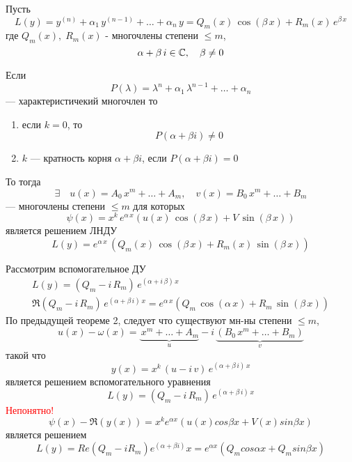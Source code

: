 \begin{Th}
    Пусть 
    \[
        L(y)=y^{(n)} + \alpha_1\,y^{(n-1)} + \dots +\alpha_n\,y=Q_m(x)\,\cos(\beta\,x) + R_m(x)\,e^{\beta\,x}
    \] 
    где $Q_m(x),\; R_m(x)$ - многочлены степени $\leqslant m$, 
    \[
        \alpha + \beta\,i \in \mathbb{C},\quad \beta \neq 0
    \]
    
    Если 
    \[
        P(\lambda) = \lambda^n + \alpha_1\,\lambda^{n-1} + \dots + \alpha_n
    \] 
    --- характеристичекий многочлен то
    \begin{enumerate}
        \item[\textbullet] если $k=0$, то
        \[
            P(\alpha + \beta i) \neq 0
        \] 
                
        \item[\textbullet] $k$ --- кратность корня $\alpha + \beta i$, если $P(\alpha + \beta i) = 0$
    \end{enumerate}
	То тогда 
    \[
        \exists \quad u(x)= A_0\,x^m + \dots + A_m, \quad v(x) = B_0\,x^m + \dots + B_m 
    \]
    --- многочлены степени $\leqslant m$ для которых 
    \[
        \psi(x) = x^k\,e^{\alpha\,x}(u(x)\,\cos(\beta\,x) + V\,\sin(\beta\,x))
    \]
    является решением ЛНДУ 
    \[
        L(y) = e^{\alpha\,x}\,(Q_m(x)\,\cos(\beta\,x) + R_m(x)\,\sin(\beta\,x))
    \]
\end{Th}

\begin{Proof}
    Рассмотрим вспомогательное ДУ 
    \begin{gather*}
        L(y) = (Q_m - i\,R_m)\,e^{(\alpha + i\,\beta)\,x}\\
        \Re (Q_m - i\,R_m)\,e^{(\alpha + \beta\,i)\,x} = e^{\alpha\,x}(Q_m\,\cos(\alpha\,x) + R_m\,\sin(\beta\,x))
    \end{gather*}
    По предыдущей теореме 2, следует что существуют мн-ны степени $\leqslant m$,
    \[
        u(x) - \omega(x) = \underbrace{\,x^m + \dots + A_m}_{u} - i\,\underbrace{(B_0\,x^m + \dots + B_m)}_{v}
    \]
    такой что
    \begin{equation*}
        y(x) = x^k\,(u - i\,v)\,e^{(\alpha + \beta\,i)\,x}
    \end{equation*}
    является решением вспомогательного уравнения
    \[
        L(y) = (Q_m - i\,R_m)\,e^{(\alpha + \beta\,i)\,x}
    \]
    \textcolor{red}{Непонятно!}\\
    \[
        \psi(x) - \Re(y(x)) = x^ke^{\alpha x}(u(x)cos\beta x + V(x)sin \beta x)
    \] 
    является решением\\
    \[
        L(y) = Re(Q_m - iR_m)e^{(\alpha + \beta i)}x = e^{\alpha x}(Q_m cos \alpha x + Q_m sin \beta x)
    \]   
\end{Proof}

